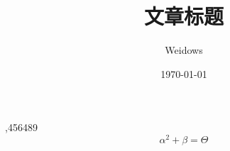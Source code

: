 \documentclass[UTF8]{ctexart}
\title{文章标题}
\author{Weidows}
\date{\today}
\begin{document}
    ,456489
    $$ \alpha^{2} + \beta = \Theta  $$
\end{document}

